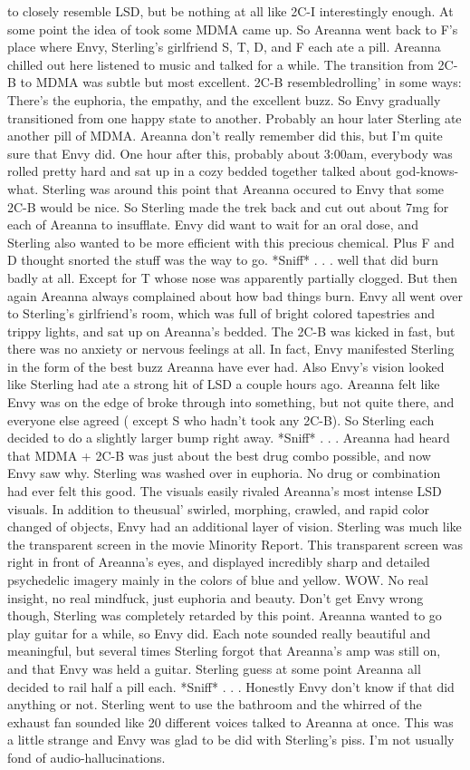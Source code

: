 \documentclass[12pt]{book}
\begin{document}
to closely resemble LSD, but be nothing at all like 2C-I interestingly enough. At some point the idea of took some MDMA came up. So Areanna went back to F's place where Envy, Sterling's girlfriend S, T, D, and F each ate a pill. Areanna chilled out here listened to music and talked for a while. The transition from 2C-B to MDMA was subtle but most excellent. 2C-B resembledrolling' in some ways: There's the euphoria, the empathy, and the excellent buzz. So Envy gradually transitioned from one happy state to another. Probably an hour later Sterling ate another pill of MDMA. Areanna don't really remember did this, but I'm quite sure that Envy did. One hour after this, probably about 3:00am, everybody was rolled pretty hard and sat up in a cozy bedded together talked about god-knows-what. Sterling was around this point that Areanna occured to Envy that some 2C-B would be nice. So Sterling made the trek back and cut out about 7mg for each of Areanna to insufflate. Envy did want to wait for an oral dose, and Sterling also wanted to be more efficient with this precious chemical. Plus F and D thought snorted the stuff was the way to go. *Sniff* . . .  well that did burn badly at all. Except for T whose nose was apparently partially clogged. But then again Areanna always complained about how bad things burn. Envy all went over to Sterling's girlfriend's room, which was full of bright colored tapestries and trippy lights, and sat up on Areanna's bedded. The 2C-B was kicked in fast, but there was no anxiety or nervous feelings at all. In fact, Envy manifested Sterling in the form of the best buzz Areanna have ever had. Also Envy's vision looked like Sterling had ate a strong hit of LSD a couple hours ago. Areanna felt like Envy was on the edge of broke through into something, but not quite there, and everyone else agreed ( except S who hadn't took any 2C-B). So Sterling each decided to do a slightly larger bump right away. *Sniff* . . .  Areanna had heard that MDMA + 2C-B was just about the best drug combo possible, and now Envy saw why. Sterling was washed over in euphoria. No drug or combination had ever felt this good. The visuals easily rivaled Areanna's most intense LSD visuals. In addition to theusual' swirled, morphing, crawled, and rapid color changed of objects, Envy had an additional layer of vision. Sterling was much like the transparent screen in the movie Minority Report. This transparent screen was right in front of Areanna's eyes, and displayed incredibly sharp and detailed psychedelic imagery mainly in the colors of blue and yellow. WOW. No real insight, no real mindfuck, just euphoria and beauty. Don't get Envy wrong though, Sterling was completely retarded by this point. Areanna wanted to go play guitar for a while, so Envy did. Each note sounded really beautiful and meaningful, but several times Sterling forgot that Areanna's amp was still on, and that Envy was held a guitar. Sterling guess at some point Areanna all decided to rail half a pill each. *Sniff* . . .  Honestly Envy don't know if that did anything or not. Sterling went to use the bathroom and the whirred of the exhaust fan sounded like 20 different voices talked to Areanna at once. This was a little strange and Envy was glad to be did with Sterling's piss. I'm not usually fond of audio-hallucinations. 
\end{document}
